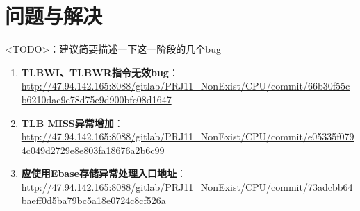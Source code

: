 \section{问题与解决}

<TODO>：建议简要描述一下这一阶段的几个bug

\begin{enumerate}
    \item {\bf TLBWI、TLBWR指令无效bug}：\url{http://47.94.142.165:8088/gitlab/PRJ11_NonExist/CPU/commit/66b30f55cb6210dac9e78d75e9d900bfc08d1647}
    \item {\bf TLB MISS异常增加}：\url{http://47.94.142.165:8088/gitlab/PRJ11_NonExist/CPU/commit/e05335f0794c049d2729e8e803fa18676a2b6c99}
    \item {\bf 应使用Ebase存储异常处理入口地址}：\url{http://47.94.142.165:8088/gitlab/PRJ11_NonExist/CPU/commit/73adcbb64baeff0d5ba79bc5a18e0724c8cf526a}
\end{enumerate}
